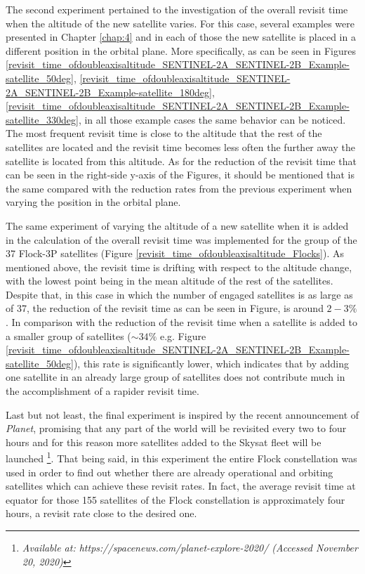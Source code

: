 \bigskip
The second experiment pertained to the investigation of the overall revisit time when the altitude of the new satellite varies. For this case, several examples were presented in Chapter \ref{chap:4} and in each of those the new satellite is placed in a different position in the orbital plane. More specifically, as can be seen in Figures \ref{revisit_time_ofdoubleaxisaltitude_SENTINEL-2A_SENTINEL-2B_Example-satellite_50deg}, \ref{revisit_time_ofdoubleaxisaltitude_SENTINEL-2A_SENTINEL-2B_Example-satellite_180deg}, \ref{revisit_time_ofdoubleaxisaltitude_SENTINEL-2A_SENTINEL-2B_Example-satellite_330deg}, in all those example cases the same behavior can be noticed. The most frequent revisit time is close to the altitude that the rest of the satellites are located and the revisit time becomes less often the further away the satellite is located from this altitude. As for the reduction of the revisit time that can be seen in the right-side y-axis of the Figures, it should be mentioned that is the same compared with the reduction rates from the previous experiment when varying the position in the orbital plane.

The same experiment of varying the altitude of a new satellite when it is added in the calculation of the overall revisit time was implemented for the group of the 37 Flock-3P satellites (Figure \ref{revisit_time_ofdoubleaxisaltitude_Flocks}). As mentioned above, the revisit time is drifting with respect to the altitude change, with the lowest point being in the mean altitude of the rest of the satellites. Despite that, in this case in which the number of engaged satellites is as large as of 37, the reduction of the revisit time as can be seen in Figure, is around $2-3\%$. In comparison with the reduction of the revisit time when a satellite is added to a smaller group of satellites ($\sim 34\%$ e.g. Figure \ref{revisit_time_ofdoubleaxisaltitude_SENTINEL-2A_SENTINEL-2B_Example-satellite_50deg}), this rate is significantly lower, which indicates that by adding one satellite in an already large group of satellites does not contribute much in the accomplishment of a rapider revisit time.

\bigskip
Last but not least, the final experiment is inspired by the recent announcement of \textit{Planet}, promising that any part of the world will be revisited every two to four hours and for this reason more satellites added to the Skysat fleet will be launched \footnote{\label{Flock_source}\textit{Available at: https://spacenews.com/planet-explore-2020/ (Accessed November 20, 2020)}}. That being said, in this experiment the entire Flock constellation was used in order to find out whether there are already operational and orbiting satellites which can achieve these revisit rates. In fact, the average revisit time at equator for those 155 satellites of the Flock constellation is approximately four hours, a revisit rate close to the desired one.

